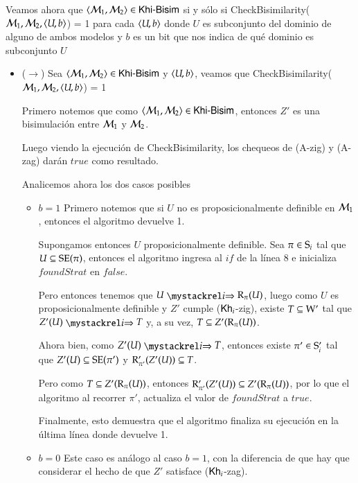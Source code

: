 \begin{demostracion}
    Veamos ahora que $\tup{\modults_1,\modults_2} \in \KHiBisim$ si y sólo si
    CheckBisimilarity($\modults_1,\modults_2,\tup{U,b}$) = 1 para cada $\tup{U,b}$ donde $U$ es subconjunto 
    del dominio de alguno de ambos modelos y $b$ es un bit que nos indica de qué dominio es subconjunto $U$

    \begin{itemize}
        \item ($\rightarrow$)
        Sea $\tup{\modults_1,\modults_2} \in \KHiBisim$ y $\tup{U,b}$, 
        veamos que CheckBisimilarity($\modults_1,\modults_2,\tup{U,b}$) = 1

        Primero notemos que como $\tup{\modults_1,\modults_2} \in \KHiBisim$, entonces $Z'$ es una bisimulación 
        entre $\modults_1$ y $\modults_2$.

        Luego viendo la ejecución de CheckBisimilarity, los chequeos de (A-zig) y (A-zag) darán $true$ como resultado.
        
        Analicemos ahora los dos casos posibles

        \begin{itemize}
            \item $b = 1$
                Primero notemos que si $U$ no es proposicionalmente definible en $\modults_1$, entonces el algoritmo devuelve 1.

                Supongamos entonces $U$ proposicionalmente definible. Sea $\pi \in \S_i$ tal que $U \subseteq \sexec(\pi)$, 
                entonces el algoritmo ingresa al $if$ de la línea 8 e inicializa $foundStrat$ en $false$.
                
                Pero entonces tenemos que $U \ultsExecAgi \R_\pi(U)$, luego como $U$ es proposicionalmente definible y 
                $Z'$ cumple ($\khi$-zig), existe $T \subseteq \W'$ tal que $Z'(U) \ultsExecAgi T$ y,
                a su vez, $T \subseteq Z'(\R_\pi(U))$.
                
                Ahora bien, como $Z'(U) \ultsExecAgi T$, entonces existe $\pi' \in \S_i'$ tal que $Z'(U) \subseteq \sexec(\pi')$ y 
                $\R'_{\pi'}(Z'(U)) \subseteq T$.
                
                Pero como $T \subseteq Z'(\R_\pi(U))$, entonces $\R'_{\pi'}(Z'(U)) \subseteq Z'(\R_\pi(U))$, por lo que 
                el algoritmo al recorrer $\pi'$, actualiza el valor de $foundStrat$ a $true$.
                
                Finalmente, esto demuestra que el algoritmo finaliza su ejecución en la última línea donde devuelve 1.
            \item $b = 0$
                Este caso es análogo al caso $b = 1$, con la diferencia de que hay que considerar el hecho de que 
                $Z'$ satisface ($\khi$-zag).
        \end{itemize}


\end{itemize}
\end{demostracion}
